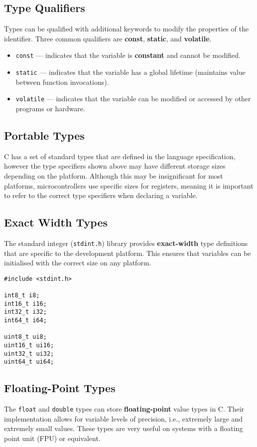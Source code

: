 \documentclass{report}
\begin{document}
\subsection{Type Qualifiers}
Types can be qualified with additional keywords to modify the
properties of the identifier. Three common qualifiers are
\textbf{const}, \textbf{static}, and \textbf{volatile}.
\begin{itemize}
    \item \texttt{const} --- indicates that the variable is \textbf{constant} and cannot be modified.
    \item \texttt{static} --- indicates that the variable has a global lifetime (maintains value between function invocations).
    \item \texttt{volatile} --- indicates that the variable can be modified or accessed by other programs or hardware.
\end{itemize}
\subsection{Portable Types}
C has a set of standard types that are defined in the language
specification, however the type specifiers shown above may have
different storage sizes depending on the platform. Although this may be
insignificant for most platforms, microcontrollers use specific sizes
for registers, meaning it is important to refer to the correct type
specifiers when declaring a variable.
\subsection{Exact Width Types}\label{sec:exact_width_types}
The standard integer (\texttt{stdint.h}) library provides
\textbf{exact-width} type definitions that are specific to the
development platform. This ensures that variables can be initialised
with the correct size on any platform.
\begin{verbatim}
#include <stdint.h>

int8_t i8;
int16_t i16;
int32_t i32;
int64_t i64;

uint8_t ui8;
uint16_t ui16;
uint32_t ui32;
uint64_t ui64;
\end{verbatim}
\subsection{Floating-Point Types}
The \texttt{float} and \texttt{double} types can store
\textbf{floating-point} value types in C. Their implementation allows
for variable levels of precision, i.e., extremely large and extremely
small values. These types are very useful on systems with a floating
point unit (FPU) or equivalent.
\end{document}
